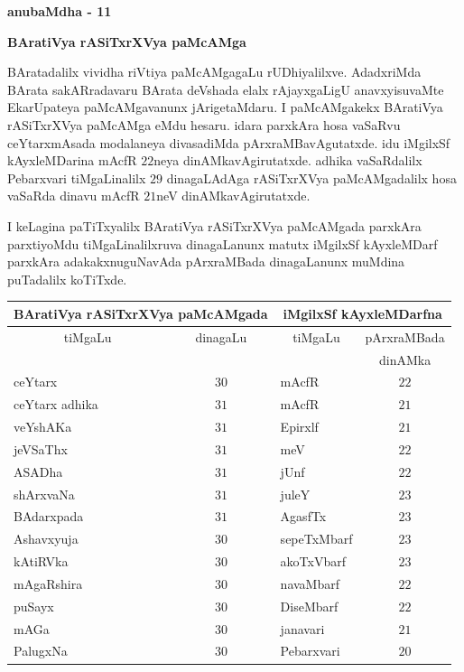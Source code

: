 \newpage

\begin{center}
{\huge\bf anubaMdha - 11}
\bigskip

{\large\bf BAratiVya rASiTxrXVya paMcAMga}
\smallskip

{\large\bf {}}
\end{center}

BAratadalilx vividha riVtiya paMcAMgagaLu rUDhiyalilxve. AdadxriMda BArata sakARradavaru BArata deVshada elalx rAjayxgaLigU anavxyisuvaMte EkarUpateya paMcAMgavanunx jArigetaMdaru. I paMcAMgakekx BAratiVya rASiTxrXVya paMcAMga eMdu hesaru. idara parxkAra hosa vaSaRvu ceYtarxmAsada modalaneya divasadiMda pArxraMBavAgutatxde. idu iMgilxSf kAyxleMDarina mAcfR $22$neya dinAMkavAgirutatxde. adhika vaSaRdalilx Pebarxvari tiMgaLinalilx $29$ dinagaLAdAga rASiTxrXVya paMcAMgadalilx hosa vaSaRda dinavu mAcfR $21$neV dinAMkavAgirutatxde.

I keLagina paTiTxyalilx BAratiVya rASiTxrXVya paMcAMgada parxkAra parxtiyoMdu tiMgaLinalilxruva dinagaLanunx matutx iMgilxSf kAyxleMDarf parxkAra adakakxnuguNavAda pArxraMBada dinagaLanunx muMdina puTadalilx koTiTxde.

{\renewcommand{\arraystretch}{1.1}
\begin{longtable}{|l|c|l|c|}
\hline
\multicolumn{2}{|c|}{BAratiVya rASiTxrXVya paMcAMgada} & \multicolumn{2}{c|}{iMgilxSf kAyxleMDarfna}\\
\hline
\multicolumn{1}{|c|}{tiMgaLu} & dinagaLu & \multicolumn{1}{c|}{tiMgaLu} & pArxraMBada\\
 & & & dinAMka\\
\hline
ceYtarx & $30$ & mAcfR & $22$\\
ceYtarx adhika & $31$ & mAcfR & $21$\\
veYshAKa & $31$ & Epirxlf & $21$\\
jeVSaThx & $31$ & meV & $22$\\
ASADha & $31$ & jUnf & $22$\\
shArxvaNa & $31$ & juleY & $23$\\
BAdarxpada & $31$ & AgasfTx & $23$\\
Ashavxyuja & $30$ & sepeTxMbarf & $23$\\
kAtiRVka & $30$ & akoTxVbarf & $23$\\
mAgaRshira & $30$ & navaMbarf & $22$\\
puSayx & $30$ & DiseMbarf & $22$\\
mAGa & $30$ & janavari & $21$\\
PalugxNa & $30$ & Pebarxvari & $20$\\
\hline
\end{longtable}}

